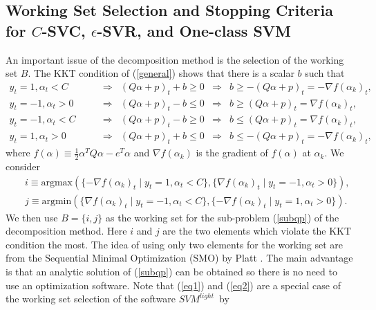 \documentclass[11pt]{article}
\newcommand{\svmlight}{$SVM^{light}$}
\theoremstyle{break}
\begin{document}
\subsection{Working Set Selection
and
Stopping Criteria 
for $C$-SVC, 
$\epsilon$-SVR, and One-class SVM} 

An important issue of the decomposition
method is the selection of the working 
set $B$.
The KKT condition of (\ref{general})
shows that there is a scalar $b$
such that
\begin{equation}
\label{kkt}
\begin{array}{lllll}
y_t = 1 , \alpha_t < C \qquad
& \Rightarrow &
(Q \alpha + p)_t + b \geq 0 
& \Rightarrow &
b \geq - (Q \alpha +p)_t 
= -\nabla f(\alpha_k)_t,
\\
y_t = -1 , \alpha_t > 0 \qquad
&  \Rightarrow &
(Q \alpha + p)_t - b \leq 0
&  \Rightarrow &
b \geq (Q \alpha + p)_t 
= \nabla f(\alpha_k)_t,
\\
y_t = -1 , \alpha_t < C \qquad
&   \Rightarrow &
(Q \alpha + p)_t - b \geq 0 
&  \Rightarrow &
b \leq (Q \alpha + p)_t
= \nabla f(\alpha_k)_t,
\\
y_t = 1, \alpha_t > 0 \qquad
&  \Rightarrow &
(Q \alpha + p)_t + b \leq 0 
&  \Rightarrow &
b \leq  - (Q \alpha + p)_t
= -\nabla f(\alpha_k)_t,
\end{array}
\end{equation}
where 
$f(\alpha)
\equiv \frac{1}{2} \alpha^T Q \alpha
- e^T \alpha$
and
$\nabla f(\alpha_k)$ is the gradient
of 
$f(\alpha)$ at $\alpha_k$.
We consider 
\begin{eqnarray}
&& i \equiv 
\mbox{argmax}
(\{-\nabla f(\alpha_k)_t 
\mid
y_t  = 1, \alpha_t < C\},
\{\nabla f(\alpha_k)_t 
\mid
y_t  = -1, \alpha_t > 0\}), 
\label{eq1}
\\
&& j \equiv
\mbox{argmin}
(\{\nabla f(\alpha_k)_t 
\mid
y_t  = -1, \alpha_t < C\},
\{-\nabla f(\alpha_k)_t 
\mid
y_t  = 1, \alpha_t > 0\}).
\label{eq2}
\end{eqnarray}
We then use 
$B = \{i, j\}$ as the working
set for the sub-problem
(\ref{subqp}) of the decomposition method.
Here $i$ and $j$ are the two elements which
violate the KKT condition the most.
The idea of using only two 
elements for the working set 
are from the 
Sequential 
Minimal Optimization (SMO) by
Platt \citeyear{JP98a}.
The main advantage is that an analytic solution
of (\ref{subqp}) can be obtained so there
is no need to use an optimization software.
Note that 
(\ref{eq1}) and (\ref{eq2}) 
are a special case of the
working set selection of the 
software \svmlight\ by
\end{document}
